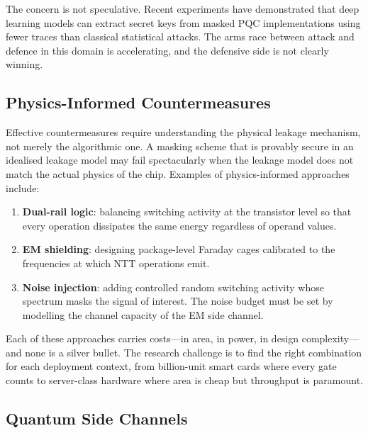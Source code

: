 The concern is not speculative.  Recent experiments have demonstrated that deep learning models can extract secret keys from masked PQC implementations using fewer traces than classical statistical attacks.  The arms race between attack and defence in this domain is accelerating, and the defensive side is not clearly winning.

\subsection{Physics-Informed Countermeasures}
\label{subsec:physics-countermeasures}

Effective countermeasures require understanding the physical leakage mechanism, not merely the algorithmic one.  A masking scheme that is provably secure in an idealised leakage model may fail spectacularly when the leakage model does not match the actual physics of the chip.  Examples of physics-informed approaches include:
\begin{enumerate}
\item \textbf{Dual-rail logic}: balancing switching activity at the transistor level so that every operation dissipates the same energy regardless of operand values.
\item \textbf{EM shielding}: designing package-level Faraday cages calibrated to the frequencies at which NTT operations emit.
\item \textbf{Noise injection}: adding controlled random switching activity whose spectrum masks the signal of interest.  The noise budget must be set by modelling the channel capacity of the EM side channel.
\end{enumerate}

Each of these approaches carries costs---in area, in power, in design complexity---and none is a silver bullet.  The research challenge is to find the right combination for each deployment context, from billion-unit smart cards where every gate counts to server-class hardware where area is cheap but throughput is paramount.

\subsection{Quantum Side Channels}
\label{subsec:quantum-side-channels}

